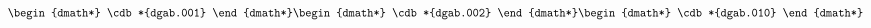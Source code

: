 \documentclass[12pt]{cdblatex}
\begin{document}
\begin{dgroup*}
   \begin{dmath*} \cdb*{dgab.001} \end{dmath*}
   \begin{dmath*} \cdb*{dgab.002} \end{dmath*}
   \begin{dmath*} \cdb*{dgab.010} \end{dmath*}
\end{dgroup*}

\clearpage
\end{document}
